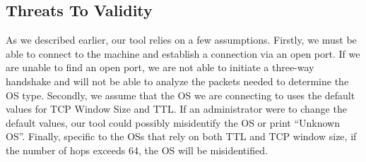 \subsection{Threats To Validity}

As we described earlier, our tool relies on a few assumptions.  Firstly, we must be able to connect to the machine and establish a connection via an open port.  If we are unable to find an open port, we are not able to initiate a three-way handshake and will not be able to analyze the packets needed to determine the OS type.  Secondly, we assume that the OS we are connecting to uses the default values for TCP Window Size and TTL.  If an administrator were to change the default values, our tool could possibly misidentify the OS or print ``Unknown OS''. Finally, specific to the OSs that rely on both TTL and TCP window size, if the number of hops exceeds 64, the OS will be misidentified.  